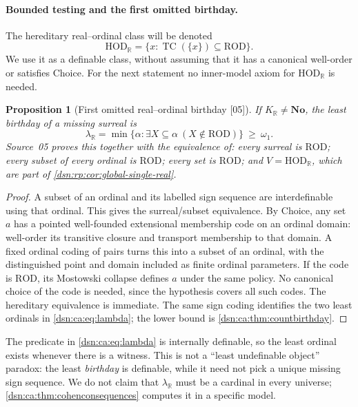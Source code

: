 \documentclass[11pt,a4paper]{article}
\numberwithin{equation}{section}
\newtheorem{proposition}[proposition]{Proposition}
\theoremstyle{definition}
\theoremstyle{remark}
\newcommand{\No}{\mathbf{No}}
\newcommand{\HOD}{\mathrm{HOD}}
\newcommand{\R}{\mathbb R}
\newcommand{\TC}{\operatorname{TC}}
\newcommand{\src}[1]{\textup{\textsf{\small[#1]}}}
\newcommand{\ROD}{\mathrm{ROD}}
\newcommand{\HR}{\HOD_{\R}}
\newcommand{\KR}{K_{\R}}
\begin{document}
\paragraph{Bounded testing and the first omitted birthday.}
The hereditary real--ordinal class will be denoted
\[
 \HR=\{x:\TC(\{x\})\subseteq\ROD\}.
\]
We use it as a definable class, without assuming that it has a canonical
well-order or satisfies Choice. For the next statement no inner-model
axiom for $\HR$ is needed.
\begin{proposition}[First omitted real--ordinal birthday \src{05}]
\label{dsn:ca:prop:globaltest}
If $\KR\ne\No$, the least birthday of a missing surreal is
\begin{equation}\label{dsn:ca:eq:lambda}
 \lambda_{\R}
 =\min\{\alpha:\exists X\subseteq\alpha\ (X\notin\ROD)\}
 \ \ge\ \omega_1.
\end{equation}
Source~05 proves this together with the equivalence of: every surreal is
$\ROD$; every subset of every ordinal is $\ROD$; every set is $\ROD$; and
$V=\HR$, which are part of \cref{dsn:rp:cor:global-single-real}.
\end{proposition}
\begin{proof}
A subset of an ordinal and its labelled sign sequence are interdefinable
using that ordinal. This gives the surreal/subset equivalence. By Choice,
any set $a$ has a pointed well-founded extensional membership code on an
ordinal domain: well-order its transitive closure and transport
membership to that domain. A fixed ordinal coding of pairs turns this
into a subset of an ordinal, with the distinguished point and domain
included as finite ordinal parameters. If the code is $\ROD$, its
Mostowski collapse defines $a$ under the same policy. No canonical
choice of the code is needed, since the hypothesis covers all such
codes. The hereditary equivalence is immediate. The same sign coding
identifies the two least ordinals in \eqref{dsn:ca:eq:lambda}; the lower bound
is \cref{dsn:ca:thm:countbirthday}.
\end{proof}
The predicate in \eqref{dsn:ca:eq:lambda} is internally definable, so the least
ordinal exists whenever there is a witness. This is not a ``least
undefinable object'' paradox: the least \emph{birthday} is definable,
while it need not pick a unique missing sign sequence. We do not claim
that $\lambda_{\R}$ must be a cardinal in every universe;
\cref{dsn:ca:thm:cohenconsequences} computes it in a specific model.
\end{document}
